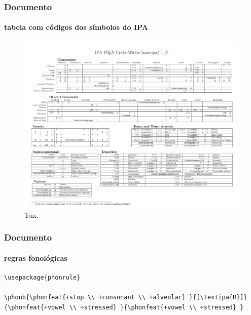 \begin{frame}[fragile]
\frametitle{Documento}
\framesubtitle{tabela com códigos dos símbolos do IPA}
\vspace{-4ex}
\begin{figure}[h!]
  \centering
  \label{fig:tipachart}
  \includegraphics[width=\textwidth]
                     {figures/tipachart_mod.pdf}
  \caption{Tux.}
\end{figure}
\end{frame}



\begin{frame}[fragile]
\frametitle{Documento}
\framesubtitle{regras fonológicas}
  \scriptsize
  \begin{verbatim}
\usepackage{phonrule}
  
\phonb{\phonfeat{+stop \\ +consonant \\ +alveolar} }{[\textipa{R}]}
{\phonfeat{+vowel \\ +stressed} }{\phonfeat{+vowel \\ +stressed} }
  \end{verbatim}

  \begin{fmpage}{\textwidth}
  \end{fmpage}

\end{frame}



